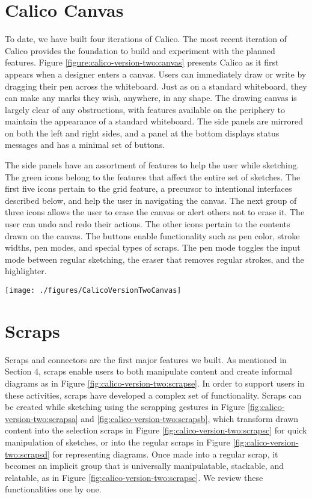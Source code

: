 \section{Calico Canvas}

To date, we have built four iterations of Calico. The most recent iteration of Calico provides the foundation to build and experiment with the planned features. Figure \ref{figure:calico-version-two:canvas} presents Calico as it first appears when a designer enters a canvas. Users can immediately draw or write by dragging their pen across the whiteboard. Just as on a standard whiteboard, they can make any marks they wish, anywhere, in any shape. The drawing canvas is largely clear of any obstructions, with features available on the periphery to maintain the appearance of a standard whiteboard. The side panels are mirrored on both the left and right sides, and a panel at the bottom displays status messages and has a minimal set of buttons. 

The side panels have an assortment of features to help the user while sketching. The green icons belong to the features that affect the entire set of sketches. The first five icons pertain to the grid feature, a precursor to intentional interfaces described below, and help the user in navigating the canvas. The next group of three icons allows the user to erase the canvas or alert others not to erase it. The user can undo and redo their actions. The other icons pertain to the contents drawn on the canvas. The buttons enable functionality such as pen color, stroke widths, pen modes, and special types of scraps. The pen mode toggles the input mode between regular sketching, the eraser that removes regular strokes, and the highlighter.  

\begin{figure*}[tbh]
  \centering
  \texttt{[image: ./figures/CalicoVersionTwoCanvas]}
  \caption{The Calico canvas interface, including the side panels and the drawing space.}
  \label{figure:calico-version-two:canvas}
\end{figure*}

\section{Scraps}

Scraps and connectors are the first major features we built. As mentioned in Section 4, scraps enable users to both manipulate content and create informal diagrams as in Figure \ref{fig:calico-version-two:scrapse}. In order to support users in these activities, scraps have developed a complex set of functionality. Scraps can be created while sketching using the scrapping gestures in Figure \ref{fig:calico-version-two:scrapsa} and \ref{fig:calico-version-two:scrapsb}, which transform drawn content into the selection scraps in Figure \ref{fig:calico-version-two:scrapsc} for quick manipulation of sketches, or into the regular scraps in Figure \ref{fig:calico-version-two:scrapsd} for representing diagrams. Once made into a regular scrap, it becomes an implicit group that is universally manipulatable, stackable, and relatable, as in Figure \ref{fig:calico-version-two:scrapse}. We review these functionalities one by one.

